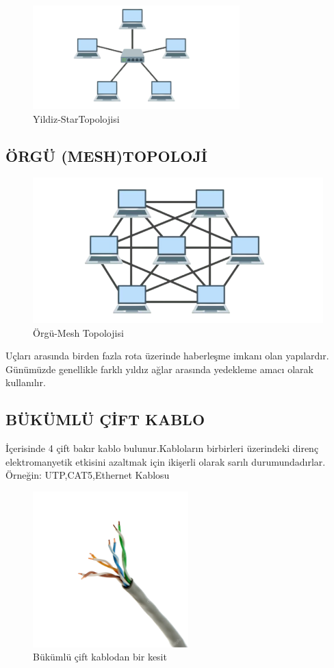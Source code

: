 \begin{figure}[H]
    \centering
    \includegraphics[width=8cm]{images/star-Topology-1024x512-removebg-preview}
    \caption{Yildiz-StarTopolojisi}
    \label{fig:yildiz_topolojisi}
\end{figure}

\subsection*{ÖRGÜ (MESH)TOPOLOJİ}

\begin{figure}[H]
    \centering
    \includegraphics[width=12cm]{images/mesh-topology-1-1024x512-removebg-preview}
    \caption{Örgü-Mesh Topolojisi}
    \label{fig:Orgu_mesh_topolojisi}
\end{figure}
Uçları arasında birden fazla rota üzerinde haberleşme imkanı olan yapılardır.
Günümüzde genellikle farklı yıldız ağlar arasında yedekleme amacı olarak kullanılır.

\subsection{BÜKÜMLÜ ÇİFT KABLO}
İçerisinde 4 çift bakır kablo bulunur.Kabloların birbirleri üzerindeki direnç elektromanyetik etkisini azaltmak için ikişerli olarak sarılı durumundadırlar.
Örneğin: UTP,CAT5,Ethernet Kablosu
\begin{figure}[H]
    \centering
    \includegraphics[width=6cm]{images/bukumlukablo}
    \caption{Bükümlü çift kablodan bir kesit}
    \label{fig:Bukumlu_cift_kablo}
\end{figure}


